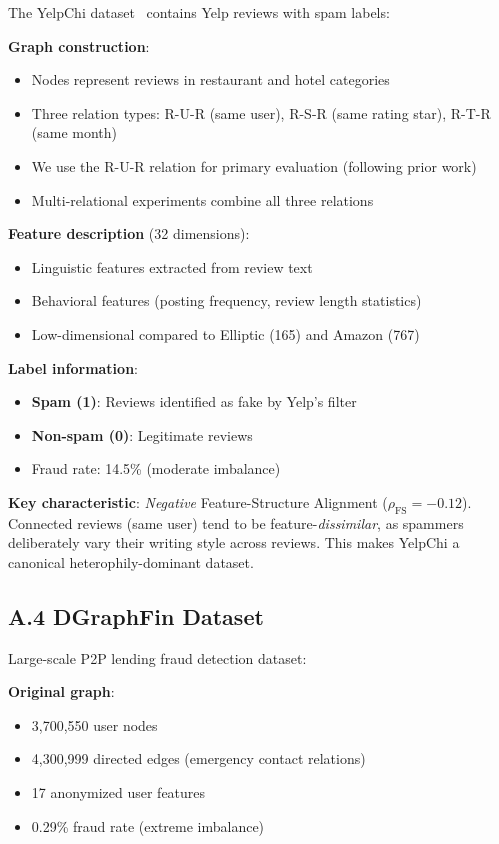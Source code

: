 The YelpChi dataset~\cite{rayana2015yelp} contains Yelp reviews with spam labels:

\textbf{Graph construction}:
\begin{itemize}
\item Nodes represent reviews in restaurant and hotel categories
\item Three relation types: R-U-R (same user), R-S-R (same rating star), R-T-R (same month)
\item We use the R-U-R relation for primary evaluation (following prior work)
\item Multi-relational experiments combine all three relations
\end{itemize}

\textbf{Feature description} (32 dimensions):
\begin{itemize}
\item Linguistic features extracted from review text
\item Behavioral features (posting frequency, review length statistics)
\item Low-dimensional compared to Elliptic (165) and Amazon (767)
\end{itemize}

\textbf{Label information}:
\begin{itemize}
\item \textbf{Spam (1)}: Reviews identified as fake by Yelp's filter
\item \textbf{Non-spam (0)}: Legitimate reviews
\item Fraud rate: 14.5\% (moderate imbalance)
\end{itemize}

\textbf{Key characteristic}: \textit{Negative} Feature-Structure Alignment ($\rho_{\text{FS}} = -0.12$). Connected reviews (same user) tend to be feature-\textit{dissimilar}, as spammers deliberately vary their writing style across reviews. This makes YelpChi a canonical heterophily-dominant dataset.

\subsection*{A.4 DGraphFin Dataset}

Large-scale P2P lending fraud detection dataset:

\textbf{Original graph}:
\begin{itemize}
\item 3,700,550 user nodes
\item 4,300,999 directed edges (emergency contact relations)
\item 17 anonymized user features
\item 0.29\% fraud rate (extreme imbalance)
\end{itemize}


